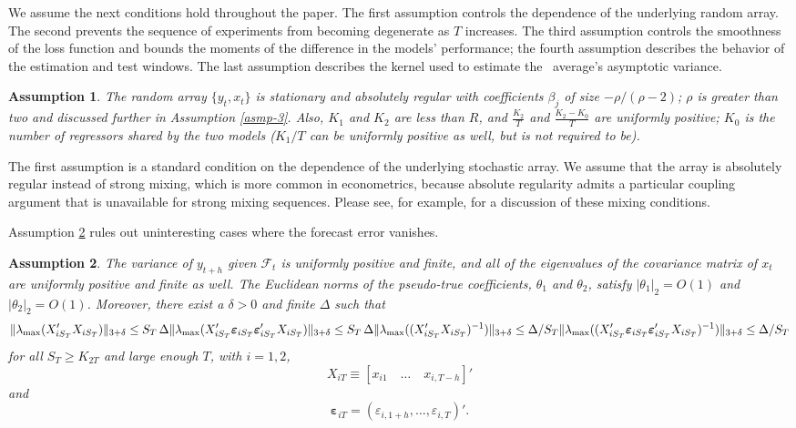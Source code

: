 \documentclass[11pt]{article}
\newtheorem{asmp}{Assumption}
\newcommand{\h}{h}
\newcommand{\ep}[1]{\ensuremath{\boldsymbol{\varepsilon}_{#1}}}
\begin{document}
We assume the next conditions hold throughout the paper.  The first
assumption controls the dependence of the underlying random array.
The second prevents the sequence of experiments from becoming
degenerate as $T$ increases.  The third assumption controls the
smoothness of the loss function and bounds the moments of the
difference in the models' performance; the fourth assumption describes
the behavior of the estimation and test windows.  The last assumption
describes the kernel used to estimate the \oos\ average's asymptotic
variance.

\begin{asmp}\label{asmp-1} 
  The random array $\{y_t,x_t\}$ is stationary and
  absolutely regular with coefficients $\beta_j$ of size
  $-\rho/(\rho-2)$; $\rho$ is greater than two and discussed further
  in Assumption \ref{asmp-3}.  Also, $K_1$ and $K_2$ are less than $R$,
  and $\frac{K_2}{T}$ and $\frac{K_2-K_0}{T}$ are uniformly positive;
  $K_0$ is the number of regressors shared by the two models ($K_1/T$
  can be uniformly positive as well, but is not required to be).
\end{asmp}

The first assumption is a standard condition on the dependence of the
underlying stochastic array.  We assume that the array is absolutely
regular instead of strong mixing, which is more common in
econometrics, because absolute regularity admits a particular coupling
argument \citep{Ber:79} that is unavailable for strong mixing
sequences.  Please see, for example, \citet{Dav:94} for a discussion
of these mixing conditions.

Assumption \ref{asmp-2} rules out uninteresting cases where the
forecast error vanishes.
\begin{asmp}\label{asmp-2}
  The variance of $y_{t+\h}$ given $\mathcal{F}_t$ is uniformly
  positive and finite, and all of the eigenvalues of the covariance
  matrix of $x_t$ are uniformly positive and finite as well.  The
  Euclidean norms of the pseudo-true coefficients, $\theta_1$ and
  $\theta_2$, satisfy $|\theta_1|_2 = O(1)$ and $|\theta_2|_2 = O(1)$.
  Moreover, there exist a $\delta > 0$ and finite $\Delta$ such that
  \begin{equation*}
    \lVert \lambda_{\max}(X_{iS_{T}}'X_{iS_{T}}) \rVert_{3+\delta}
    \leq S_{T}\, \Delta \\
    \lVert
    \lambda_{\max}(X_{iS_{T}}'\ep{iS_{T}}\ep{iS_{T}}'X_{iS_{T}})
    \rVert_{3+\delta} \leq S_{T}\, \Delta \\
    \lVert \lambda_{\max}((X_{iS_{T}}'X_{iS_{T}})^{-1}) \rVert_{3+\delta} \leq \Delta/S_{T} \\
    \lVert
    \lambda_{\max}((X_{iS_{T}}'\ep{iS_{T}}\ep{iS_{T}}'X_{iS_{T}})^{-1})\rVert_{3+\delta}
    \leq \Delta/S_{T}
  \end{equation*}
  for all $S_{T} \geq K_{2T}$ and large enough $T$, with $i =
  1,2$,
  \[ X_{iT} \equiv [x_{i1} \quad \dots \quad x_{i,T-\h}]' \]
  and
  \[ \ep{iT} = (\varepsilon_{i,1+\h}, \dots, \varepsilon_{i,T})'.\]
\end{asmp}
\end{document}

